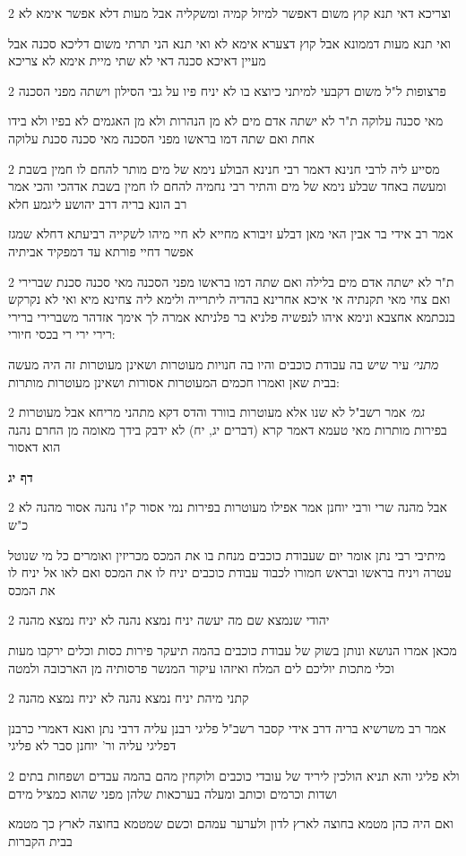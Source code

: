 \documentclass[12pt, openany]{book}
\newcommand{\sethebfont}{
\fontsize{10.5pt}{21.0pt} \selectfont
}
\newcommand{\twocol}[1]{
	{\sethebfont \begin{multicols}{2}
			#1
	\end{multicols}}	
}
\newcommand{\sectname}{}
\newcommand{\newsection}[1]{
	\addcontentsline{toc}{section}{#1}
	\renewcommand{\sectname}{#1}	
	\vspace{-\baselineskip}
	\begin{center}
		\textbf{%
\fontsize{16pt}{16pt}\selectfont
			#1}
	\end{center}
	\vspace{-\baselineskip}
	\nopagebreak
}
\begin{document}
\twocol{וצריכא דאי תנא קוץ משום דאפשר למיזל קמיה ומשקליה אבל מעות דלא אפשר אימא לא
\par ואי תנא מעות דממונא אבל קוץ דצערא אימא לא ואי תנא הני תרתי משום דליכא סכנה אבל מעיין דאיכא סכנה דאי לא שתי מיית אימא לא צריכא}
\twocol{פרצופות ל"ל משום דקבעי למיתני כיוצא בו לא יניח פיו על גבי הסילון וישתה מפני הסכנה
\par מאי סכנה עלוקה ת"ר לא ישתה אדם מים לא מן הנהרות ולא מן האגמים לא בפיו ולא בידו אחת ואם שתה דמו בראשו מפני הסכנה מאי סכנה סכנת עלוקה}
\twocol{מסייע ליה לרבי חנינא דאמר רבי חנינא הבולע נימא של מים מותר להחם לו חמין בשבת ומעשה באחד שבלע נימא של מים והתיר רבי נחמיה להחם לו חמין בשבת אדהכי והכי אמר רב הונא בריה דרב יהושע ליגמע חלא
\par אמר רב אידי בר אבין האי מאן דבלע זיבורא מחייא לא חיי מיהו לשקייה רביעתא דחלא שמגז אפשר דחיי פורתא עד דמפקיד אביתיה}
\twocol{ת"ר לא ישתה אדם מים בלילה ואם שתה דמו בראשו מפני הסכנה מאי סכנה סכנת שברירי ואם צחי מאי תקנתיה אי איכא אחרינא בהדיה ליתרייה ולימא ליה צחינא מיא ואי לא נקרקש בנכתמא אחצבא ונימא איהו לנפשיה פלניא בר פלניתא אמרה לך אימך אזדהר משברירי ברירי רירי ירי רי בכסי חיורי:
\par {\large\emph{מתני׳}} עיר שיש בה עבודת כוכבים והיו בה חנויות מעוטרות ושאינן מעוטרות זה היה מעשה בבית שאן ואמרו חכמים המעוטרות אסורות ושאינן מעוטרות מותרות:}
\twocol{{\large\emph{גמ׳}} אמר רשב"ל לא שנו אלא מעוטרות בוורד והדס דקא מתהני מריחא אבל מעוטרות בפירות מותרות מאי טעמא דאמר קרא (דברים יג, יח) לא ידבק בידך מאומה מן החרם נהנה הוא דאסור}
\newsection{דף יג}
\twocol{אבל מהנה שרי ורבי יוחנן אמר אפילו מעוטרות בפירות נמי אסור ק"ו נהנה אסור מהנה לא כ"ש
\par מיתיבי רבי נתן אומר יום שעבודת כוכבים מנחת בו את המכס מכריזין ואומרים כל מי שנוטל עטרה ויניח בראשו ובראש חמורו לכבוד עבודת כוכבים יניח לו את המכס ואם לאו אל יניח לו את המכס}
\twocol{יהודי שנמצא שם מה יעשה יניח נמצא נהנה לא יניח נמצא מהנה
\par מכאן אמרו הנושא ונותן בשוק של עבודת כוכבים בהמה תיעקר פירות כסות וכלים ירקבו מעות וכלי מתכות יוליכם לים המלח ואיזהו עיקור המנשר פרסותיה מן הארכובה ולמטה}
\twocol{קתני מיהת יניח נמצא נהנה לא יניח נמצא מהנה
\par אמר רב משרשיא בריה דרב אידי קסבר רשב"ל פליגי רבנן עליה דרבי נתן ואנא דאמרי כרבנן דפליגי עליה ור' יוחנן סבר לא פליגי}
\twocol{ולא פליגי והא תניא הולכין ליריד של עובדי כוכבים ולוקחין מהם בהמה עבדים ושפחות בתים ושדות וכרמים וכותב ומעלה בערכאות שלהן מפני שהוא כמציל מידם
\par ואם היה כהן מטמא בחוצה לארץ לדון ולערער עמהם וכשם שמטמא בחוצה לארץ כך מטמא בבית הקברות}
\end{document}
